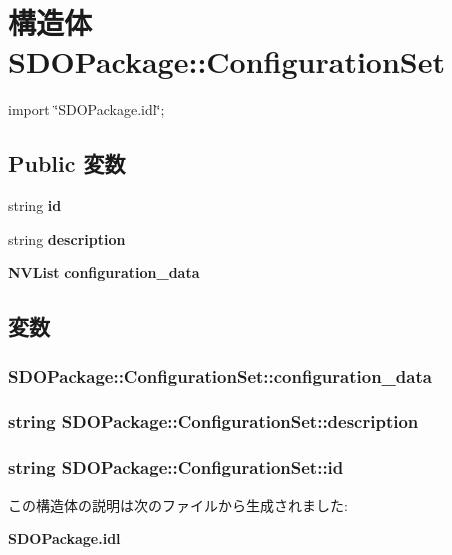 \section{構造体 SDOPackage::ConfigurationSet}
\label{structSDOPackage_1_1ConfigurationSet}


{\ttfamily import \char`\"{}SDOPackage.idl\char`\"{};}

\subsection*{Public 変数}
\begin{DoxyCompactItemize}
\item 
string {\bf id}
\item 
string {\bf description}
\item 
{\bf NVList} {\bf configuration\_\-data}
\end{DoxyCompactItemize}


\subsection{変数}
\subsubsection[{configuration\_\-data}]{ {\bf SDOPackage::ConfigurationSet::configuration\_\-data}}\label{structSDOPackage_1_1ConfigurationSet_ae28985bc93cdf23fc12357aa03552ebb}
\subsubsection[{description}]{\setlength{\rightskip}{0pt plus 5cm}string {\bf SDOPackage::ConfigurationSet::description}}\label{structSDOPackage_1_1ConfigurationSet_ab29b970de7ba627ab35ad294e92c7983}
\subsubsection[{id}]{\setlength{\rightskip}{0pt plus 5cm}string {\bf SDOPackage::ConfigurationSet::id}}\label{structSDOPackage_1_1ConfigurationSet_a2e6620e0ecf1dbbefb4d25ec3d0e6ca5}


この構造体の説明は次のファイルから生成されました:\begin{DoxyCompactItemize}
\item 
{\bf SDOPackage.idl}\end{DoxyCompactItemize}
